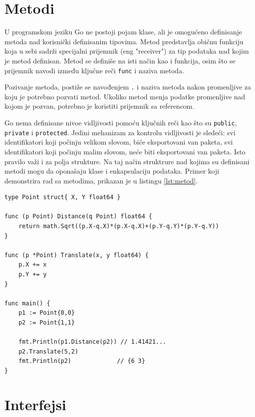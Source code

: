\documentclass[12pt,oneside]{memoir}
\begin{document}
\section{Metodi}  \label{metod}

U programskom jeziku Go ne postoji pojam klase, ali je omogućeno definisanje metoda nad korisnički definisanim tipovima. Metod predstavlja običnu funkciju koja u sebi sadrži specijalni prijemnik (eng "receiver") za tip podataka nad kojim je metod definisan. Metod se definiše na isti način kao i funkcija, osim što se prijemnik navodi između ključne reči \texttt{func} i naziva metoda.

Pozivanje metoda, postiže se navođenjem \texttt{.} i naziva metoda nakon promenljive za koju je potrebno pozvati metod. Ukoliko metod menja podatke promenljive nad kojom je pozvan, potrebno je koristiti prijemnik sa referencom. 
 
Go nema definisane nivoe vidljivosti  pomoću ključnih reči kao što su \texttt{public}, \texttt{private} i \texttt{protected}. Jedini mehanizam za kontrolu vidljivosti je sledeći: svi identifikatori koji počinju velikom slovom, biće eksportovani van paketa, svi identifikatori koji počinju malim slovom, neće biti eksportovani van paketa\cite{bookGoProg}. Isto pravilo važi i za polja strukture. Na taj način struktrure nad kojima su definisani metodi mogu da oponašaju klase i enkapsulaciju podataka. Primer koji demonstrira rad sa metodima, prikazan je u listingu \ref{lst:metod}.

\begin{center}
\begin{lstlisting}[caption=Primer koji demonstrira rad sa metodima, label={lst:metod},  backgroundcolor=\color{background}]
type Point struct{ X, Y float64 }

func (p Point) Distance(q Point) float64 {
	return math.Sqrt((p.X-q.X)*(p.X-q.X)+(p.Y-q.Y)*(p.Y-q.Y))
}

func (p *Point) Translate(x, y float64) {
	p.X += x
	p.Y += y
}

func main() {
	p1 := Point{0,0}
	p2 := Point{1,1}

	fmt.Println(p1.Distance(p2)) // 1.41421...
	p2.Translate(5,2)
	fmt.Println(p2)				// {6 3}
}
\end{lstlisting}
\end{center}

\section{Interfejsi}
\end{document}
